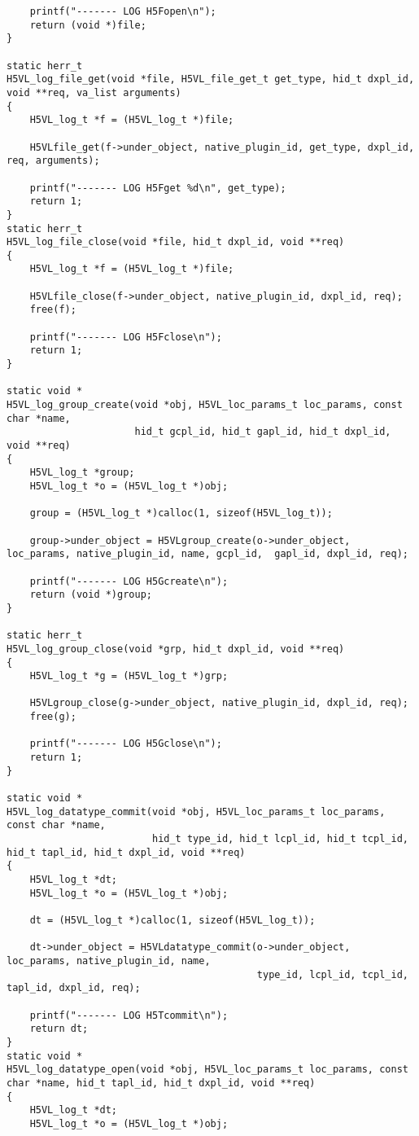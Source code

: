 \begin{lstlisting}
    printf("------- LOG H5Fopen\n");
    return (void *)file;
}

static herr_t 
H5VL_log_file_get(void *file, H5VL_file_get_t get_type, hid_t dxpl_id, void **req, va_list arguments)
{
    H5VL_log_t *f = (H5VL_log_t *)file;

    H5VLfile_get(f->under_object, native_plugin_id, get_type, dxpl_id, req, arguments);

    printf("------- LOG H5Fget %d\n", get_type);
    return 1;
}
static herr_t 
H5VL_log_file_close(void *file, hid_t dxpl_id, void **req)
{
    H5VL_log_t *f = (H5VL_log_t *)file;

    H5VLfile_close(f->under_object, native_plugin_id, dxpl_id, req);
    free(f);

    printf("------- LOG H5Fclose\n");
    return 1;
}

static void *
H5VL_log_group_create(void *obj, H5VL_loc_params_t loc_params, const char *name, 
                      hid_t gcpl_id, hid_t gapl_id, hid_t dxpl_id, void **req)
{
    H5VL_log_t *group;
    H5VL_log_t *o = (H5VL_log_t *)obj;

    group = (H5VL_log_t *)calloc(1, sizeof(H5VL_log_t));

    group->under_object = H5VLgroup_create(o->under_object, loc_params, native_plugin_id, name, gcpl_id,  gapl_id, dxpl_id, req);

    printf("------- LOG H5Gcreate\n");
    return (void *)group;
}

static herr_t 
H5VL_log_group_close(void *grp, hid_t dxpl_id, void **req)
{
    H5VL_log_t *g = (H5VL_log_t *)grp;

    H5VLgroup_close(g->under_object, native_plugin_id, dxpl_id, req);
    free(g);

    printf("------- LOG H5Gclose\n");
    return 1;
}

static void *
H5VL_log_datatype_commit(void *obj, H5VL_loc_params_t loc_params, const char *name, 
                         hid_t type_id, hid_t lcpl_id, hid_t tcpl_id, hid_t tapl_id, hid_t dxpl_id, void **req)
{
    H5VL_log_t *dt;
    H5VL_log_t *o = (H5VL_log_t *)obj;

    dt = (H5VL_log_t *)calloc(1, sizeof(H5VL_log_t));

    dt->under_object = H5VLdatatype_commit(o->under_object, loc_params, native_plugin_id, name, 
                                           type_id, lcpl_id, tcpl_id, tapl_id, dxpl_id, req);

    printf("------- LOG H5Tcommit\n");
    return dt;
}
static void *
H5VL_log_datatype_open(void *obj, H5VL_loc_params_t loc_params, const char *name, hid_t tapl_id, hid_t dxpl_id, void **req)
{
    H5VL_log_t *dt;
    H5VL_log_t *o = (H5VL_log_t *)obj;  


\end{lstlisting}
